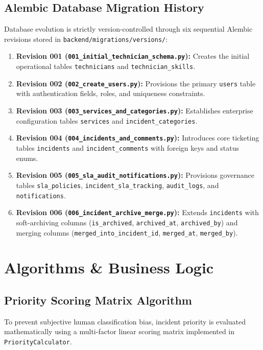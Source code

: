 \documentclass[11pt,a4paper,oneside]{report}
\begin{document}
\section{Alembic Database Migration History}
\label{sec:db_migrations}
Database evolution is strictly version-controlled through six sequential Alembic revisions stored in \texttt{backend/migrations/versions/}:
\begin{enumerate}
    \item \textbf{Revision 001 (\texttt{001\_initial\_technician\_schema.py}):} Creates the initial operational tables \texttt{technicians} and \texttt{technician\_skills}.
    \item \textbf{Revision 002 (\texttt{002\_create\_users.py}):} Provisions the primary \texttt{users} table with authentication fields, roles, and uniqueness constraints.
    \item \textbf{Revision 003 (\texttt{003\_services\_and\_categories.py}):} Establishes enterprise configuration tables \texttt{services} and \texttt{incident\_categories}.
    \item \textbf{Revision 004 (\texttt{004\_incidents\_and\_comments.py}):} Introduces core ticketing tables \texttt{incidents} and \texttt{incident\_comments} with foreign keys and status enums.
    \item \textbf{Revision 005 (\texttt{005\_sla\_audit\_notifications.py}):} Provisions governance tables \texttt{sla\_policies}, \texttt{incident\_sla\_tracking}, \texttt{audit\_logs}, and \texttt{notifications}.
    \item \textbf{Revision 006 (\texttt{006\_incident\_archive\_merge.py}):} Extends \texttt{incidents} with soft-archiving columns (\texttt{is\_archived}, \texttt{archived\_at}, \texttt{archived\_by}) and merging columns (\texttt{merged\_into\_incident\_id}, \texttt{merged\_at}, \texttt{merged\_by}).
\end{enumerate}


\chapter{Algorithms \& Business Logic}
\label{ch:algorithms}

\section{Priority Scoring Matrix Algorithm}
\label{sec:algo_priority}
To prevent subjective human classification bias, incident priority is evaluated mathematically using a multi-factor linear scoring matrix implemented in \texttt{PriorityCalculator}.
\end{document}
